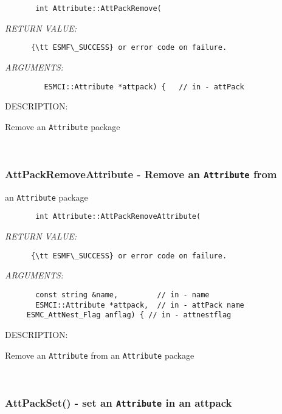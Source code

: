   
\begin{verbatim}       int Attribute::AttPackRemove(
   \end{verbatim}{\em RETURN VALUE:}
\begin{verbatim}      {\tt ESMF\_SUCCESS} or error code on failure.
   \end{verbatim}{\em ARGUMENTS:}
\begin{verbatim}         ESMCI::Attribute *attpack) {   // in - attPack
   \end{verbatim}
{\sf DESCRIPTION:\\ }


       Remove an {\tt Attribute} package
  
 
\mbox{}\hrulefill\
 
\subsubsection [AttPackRemoveAttribute] {AttPackRemoveAttribute - Remove an {\tt Attribute} from}


                                              an {\tt Attribute} package
  
\begin{verbatim}       int Attribute::AttPackRemoveAttribute(
   \end{verbatim}{\em RETURN VALUE:}
\begin{verbatim}      {\tt ESMF\_SUCCESS} or error code on failure.
   \end{verbatim}{\em ARGUMENTS:}
\begin{verbatim}       const string &name,         // in - name
       ESMCI::Attribute *attpack,  // in - attPack name
     ESMC_AttNest_Flag anflag) { // in - attnestflag
   \end{verbatim}
{\sf DESCRIPTION:\\ }


       Remove an {\tt Attribute} from an {\tt Attribute} package
  
 
\mbox{}\hrulefill\
 
\subsubsection [AttPackSet()] {AttPackSet() - set an {\tt Attribute} in an attpack}


